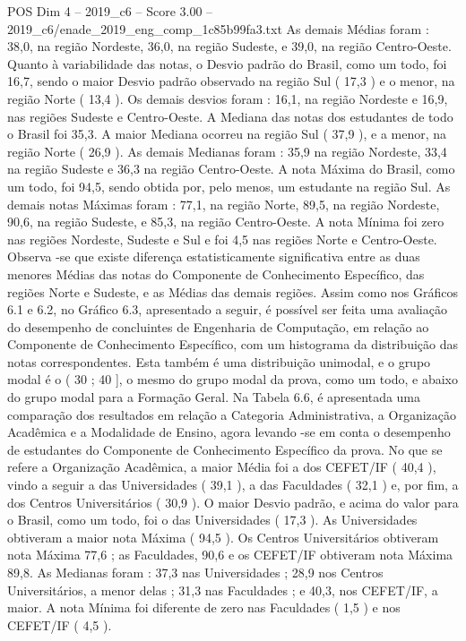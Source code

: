 \begin{textsample}{POS Dim 4 – 2019\_c6 – Score 3.00 – 2019\_c6/enade\_2019\_eng\_comp\_1c85b99fa3.txt}
As demais Médias foram : 38,0, na região Nordeste, 36,0, na região Sudeste, e 39,0, na região Centro-Oeste.
Quanto à variabilidade das notas, o Desvio padrão do Brasil, como um todo, foi 16,7, sendo o maior Desvio padrão observado na região Sul ( 17,3 ) e o menor, na região Norte ( 13,4 ).
Os demais desvios foram : 16,1, na região Nordeste e 16,9, nas regiões Sudeste e Centro-Oeste.
A Mediana das notas dos estudantes de todo o Brasil foi 35,3.
A maior Mediana ocorreu na região Sul ( 37,9 ), e a menor, na região Norte ( 26,9 ).
As demais Medianas foram : 35,9 na região Nordeste, 33,4 na região Sudeste e 36,3 na região Centro-Oeste.
A nota Máxima do Brasil, como um todo, foi 94,5, sendo obtida por, pelo menos, um estudante na região Sul.
As demais notas Máximas foram : 77,1, na região Norte, 89,5, na região Nordeste, 90,6, na região Sudeste, e 85,3, na região Centro-Oeste.
A nota Mínima foi zero nas regiões Nordeste, Sudeste e Sul e foi 4,5 nas regiões Norte e Centro-Oeste.
Observa -se que existe diferença estatisticamente significativa entre as duas menores Médias das notas do Componente de Conhecimento Específico, das regiões Norte e Sudeste, e as Médias das demais regiões.
Assim como nos Gráficos 6.1 e 6.2, no Gráfico 6.3, apresentado a seguir, é possível ser feita uma avaliação do desempenho de concluintes de Engenharia de Computação, em relação ao Componente de Conhecimento Específico, com um histograma da distribuição das notas correspondentes.
Esta também é uma distribuição unimodal, e o grupo modal é o ( 30 ; 40 ], o mesmo do grupo modal da prova, como um todo, e abaixo do grupo modal para a Formação Geral.
Na Tabela 6.6, é apresentada uma comparação dos resultados em relação a Categoria Administrativa, a Organização Acadêmica e a Modalidade de Ensino, agora levando -se em conta o desempenho de estudantes do Componente de Conhecimento Específico da prova.
No que se refere a Organização Acadêmica, a maior Média foi a dos CEFET/IF ( 40,4 ), vindo a seguir a das Universidades ( 39,1 ), a das Faculdades ( 32,1 ) e, por fim, a dos Centros Universitários ( 30,9 ).
O maior Desvio padrão, e acima do valor para o Brasil, como um todo, foi o das Universidades ( 17,3 ).
As Universidades obtiveram a maior nota Máxima ( 94,5 ).
Os Centros Universitários obtiveram nota Máxima 77,6 ; as Faculdades, 90,6 e os CEFET/IF obtiveram nota Máxima 89,8.
As Medianas foram : 37,3 nas Universidades ; 28,9 nos Centros Universitários, a menor delas ; 31,3 nas Faculdades ; e 40,3, nos CEFET/IF, a maior.
A nota Mínima foi diferente de zero nas Faculdades ( 1,5 ) e nos CEFET/IF ( 4,5 ).

\end{textsample}
